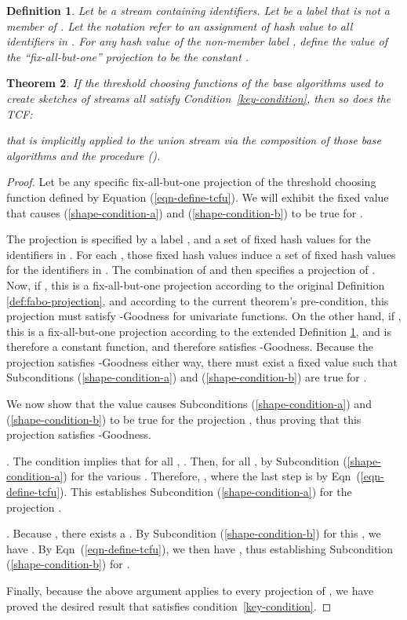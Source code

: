 \documentclass{article}
\newtheorem{theorem}{Theorem}[section]
\newtheorem{definition}[theorem]{Definition}
\begin{document}
\begin{definition}\label{def:extended-projection}
Let  be a stream containing  identifiers. Let  be a label that is {\em not} a member of . 
Let the notation  refer to an assignment of hash value to {\em all} identifiers in .
For any hash value  of the non-member label ,
define the value of the ``fix-all-but-one'' projection
 to be the constant .
\end{definition}


\begin{theorem}\label{thm-union-preserves-condition} \label{thm:preserved}
If the threshold choosing functions  of the base algorithms used to create sketches 
of  streams  all satisfy Condition~\ref{key-condition},
then so does the TCF:

that is implicitly applied to the union stream via the composition of those base
algorithms and the procedure ().
\end{theorem}
\begin{proof}
Let  be any specific fix-all-but-one projection of the threshold choosing function 
 defined by Equation (\ref{eqn-define-tcfu}). We will exhibit the fixed value  that
causes (\ref{shape-condition-a}) and (\ref{shape-condition-b}) to be true for .

The projection  is specified by a label , and a set  
of fixed hash values for the identifiers in 
\mbox{}.
For each , those fixed hash values  induce a set  of 
fixed hash values for the identifiers in . 
The combination of  and  then specifies
a projection  of . 
Now, if , this is a fix-all-but-one projection according to the original Definition \ref{def:fabo-projection},
and according to the current theorem's pre-condition, this projection must satisfy -Goodness for univariate functions.
On the other hand, if , this is a fix-all-but-one projection according to the extended Definition 
\ref{def:extended-projection}, and is therefore a constant function, and therefore 
satisfies -Goodness.
Because the projection  
satisfies -Goodness
either way, there must exist a fixed value 
such that Subconditions (\ref{shape-condition-a}) and (\ref{shape-condition-b}) are true for . 

\noindent We now show that the value 
causes Subconditions (\ref{shape-condition-a}) and (\ref{shape-condition-b}) to be true for the projection
, thus proving that this projection
satisfies -Goodness.


\medskip 
{} 
. 
The condition  implies
that  for all , . Then, for all ,  
by Subcondition (\ref{shape-condition-a}) for the various . Therefore,
,
where the last step is by Eqn~(\ref{eqn-define-tcfu}).
This establishes Subcondition (\ref{shape-condition-a}) for the projection . 

\medskip
{} 
. Because ,
there exists a . 
By Subcondition (\ref{shape-condition-b}) for this , we have . By
Eqn~(\ref{eqn-define-tcfu}), we then have , thus establishing
Subcondition (\ref{shape-condition-b}) for . 

Finally, because the above argument applies to every
projection  of , we have proved the desired 
result that  satisfies condition~\ref{key-condition}.
\end{proof}
\end{document}
